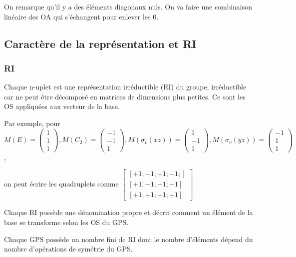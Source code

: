 \documentclass[french]{yLectureNote}
\begin{document}
On remarque qu'il y a des éléments diagonaux nuls. On va faire une combinaison linéaire des OA qui s'échangent pour enlever les 0.

\subsection{Caractère de la représentation et RI}
\subsubsection{RI}
\begin{definition}[RI]
Chaque n-uplet est une représentation irréductible (RI) du groupe, irréductible car ne peut être
décomposé en matrices de dimensions plus petites. Ce sont les OS appliquées aux vecteur de la base.
\end{definition}
Par exemple, pour \(M(E) = \begin{pmatrix}
1\\1\\1
\end{pmatrix}, M(C_2) = \begin{pmatrix}
-1\\-1\\1
\end{pmatrix},  M(\sigma_v(xz)) = \begin{pmatrix}
1\\-1\\1
\end{pmatrix}, M(\sigma_v(yz)) = \begin{pmatrix}
-1\\1\\1
\end{pmatrix}\),

on peut écrire les quadruplets comme \(\begin{bmatrix}
[+1;-1;+1;-1;]\\
[+1;-1;-1;+1]\\
[+1;+1;+1;+1]
\end{bmatrix}\)

Chaque RI possède une dénomination propre et décrit comment un élément de la base se transforme selon les OS du GPS.

Chaque GPS possède un nombre fini de RI dont le nombre d’éléments dépend du nombre d’opérations de
symétrie du GPS.

\end{document}
